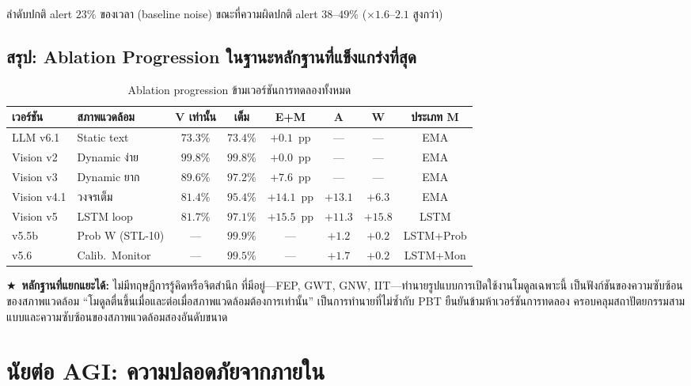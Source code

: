 \documentclass[12pt,a4paper]{article}
\newcommand{\starred}{\textbf{\textcolor{pbtblue}{$\bigstar$}}~}
\begin{document}
ลำดับปกติ alert $23\%$ ของเวลา (baseline noise)
ขณะที่ความผิดปกติ alert $38$--$49\%$ ($\times 1.6$--$2.1$ สูงกว่า)

\subsection{สรุป: Ablation Progression ในฐานะหลักฐานที่แข็งแกร่งที่สุด}

\begin{table}[!htbp]
\centering
\caption{Ablation progression ข้ามเวอร์ชันการทดลองทั้งหมด}
\label{tab:ablation_full}
\small
\begin{tabular}{@{}llcccccc@{}}
\toprule
\textbf{เวอร์ชัน} & \textbf{สภาพแวดล้อม}
  & \textbf{V เท่านั้น} & \textbf{เต็ม}
  & \textbf{E+M} & \textbf{A} & \textbf{W} & \textbf{ประเภท M}\\
\midrule
LLM v6.1    & Static text   & $73.3\%$ & $73.4\%$ & $+0.1$~pp  & ---    & ---    & EMA  \\
Vision v2   & Dynamic ง่าย  & $99.8\%$ & $99.8\%$ & $+0.0$~pp  & ---    & ---    & EMA  \\
Vision v3   & Dynamic ยาก  & $89.6\%$ & $97.2\%$ & $+7.6$~pp  & ---    & ---    & EMA  \\
Vision v4.1 & วงจรเต็ม     & $81.4\%$ & $95.4\%$ & $+14.1$~pp & $+13.1$& $+6.3$ & EMA  \\
Vision v5   & LSTM loop     & $81.7\%$ & $97.1\%$ & $+15.5$~pp & $+11.3$& $+15.8$& LSTM \\
\midrule
v5.5b & Prob W (STL-10)  & --- & $\mathbf{99.9\%}$ & --- & $+1.2$ & $+0.2$ & LSTM+Prob \\
v5.6  & Calib.\ Monitor  & --- & $99.5\%$ & --- & $+1.7$ & $+0.2$ & LSTM+Mon \\
\bottomrule
\end{tabular}
\end{table}

\starred\textbf{หลักฐานที่แยกแยะได้:} ไม่มีทฤษฎีการรู้คิดหรือจิตสำนึก
ที่มีอยู่---FEP, GWT, GNW, IIT---ทำนายรูปแบบการเปิดใช้งานโมดูลเฉพาะนี้
เป็นฟังก์ชันของความซับซ้อนของสภาพแวดล้อม
``โมดูลตื่นขึ้นเมื่อและต่อเมื่อสภาพแวดล้อมต้องการเท่านั้น''
เป็นการทำนายที่ไม่ซ้ำกับ PBT ยืนยันข้ามห้าเวอร์ชันการทดลอง
ครอบคลุมสถาปัตยกรรมสามแบบและความซับซ้อนของสภาพแวดล้อมสองอันดับขนาด


\FloatBarrier
\section{นัยต่อ AGI: ความปลอดภัยจากภายใน}
\label{sec:implications}
\end{document}
